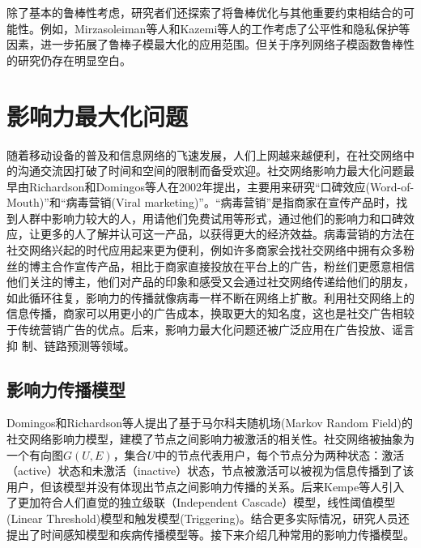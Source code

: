 除了基本的鲁棒性考虑，研究者们还探索了将鲁棒优化与其他重要约束相结合的可能性。例如，Mirzasoleiman等人\cite{mirzasoleiman2017deletion}和Kazemi等人\cite{kazemi2018scalable}的工作考虑了公平性和隐私保护等因素，进一步拓展了鲁棒子模最大化的应用范围。但关于序列网络子模函数鲁棒性的研究仍存在明显空白。


\section{影响力最大化问题}
\label{sec:2_3}

随着移动设备的普及和信息网络的飞速发展，人们上网越来越便利，在社交网络中的沟通交流因打破了时间和空间的限制而备受欢迎。社交网络影响力最大化问题最早由Richardson和Domingos等人\cite{richardson2002mining}在2002年提出，主要用来研究“口碑效应(Word-of-Mouth)”和“病毒营销(Viral marketing)”。“病毒营销”是指商家在宣传产品时，找到人群中影响力较大的人，用请他们免费试用等形式，通过他们的影响力和口碑效应，让更多的人了解并认可这一产品，以获得更大的经济效益。病毒营销的方法在社交网络兴起的时代应用起来更为便利，例如许多商家会找社交网络中拥有众多粉丝的博主合作宣传产品，相比于商家直接投放在平台上的广告，粉丝们更愿意相信他们关注的博主，他们对产品的印象和感受又会通过社交网络传递给他们的朋友，如此循环往复，影响力的传播就像病毒一样不断在网络上扩散。利用社交网络上的信息传播，商家可以用更小的广告成本，换取更大的知名度，这也是社交广告相较于传统营销广告的优点。后来，影响力最大化问题还被广泛应用在广告投放\cite{zhang2020geodemographic,zeng2021business,saleem2019effective}、谣言抑
制\cite{shi2019adaptive,zhong2023rumor,myilsamy2024optimal}、链路预测\cite{tripathi2022network,daud2020applications}等领域。


\subsection{影响力传播模型}

Domingos和Richardson等人\cite{domingos2001mining}提出了基于马尔科夫随机场(Markov Random Field)的社交网络影响力模型，建模了节点之间影响力被激活的相关性。社交网络被抽象为一个有向图$G(U,E)$，集合$U$中的节点代表用户，每个节点分为两种状态：激活（active）状态和未激活（inactive）状态，节点被激活可以被视为信息传播到了该用户，但该模型并没有体现出节点之间影响力传播的关系。后来Kempe等人\cite{kempe2003maximizing}引入了更加符合人们直觉的独立级联（Independent Cascade）模型，线性阈值模型(Linear Threshold)模型和触发模型(Triggering)。结合更多实际情况，研究人员还提出了时间感知模型\cite{chen2012time}和疾病传播模型\cite{shah2010detecting}等。接下来介绍几种常用的影响力传播模型。

